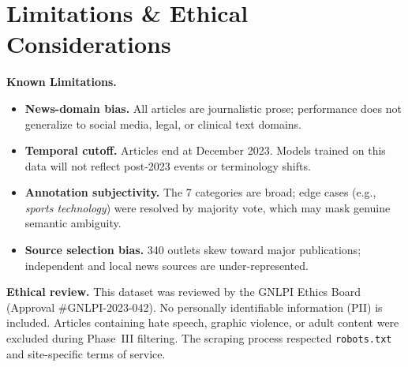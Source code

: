 \section{Limitations \& Ethical Considerations}

\begin{warnbox}
  \textbf{\textcolor{orange}{\faExclamationTriangle}\quad Known Limitations.}
  \begin{itemize}[leftmargin=*]
    \item \textbf{News-domain bias.} All articles are journalistic prose; performance
          does not generalize to social media, legal, or clinical text domains.
    \item \textbf{Temporal cutoff.} Articles end at December 2023. Models trained on this
          data will not reflect post-2023 events or terminology shifts.
    \item \textbf{Annotation subjectivity.} The 7 categories are broad; edge cases
          (e.g., \textit{sports technology}) were resolved by majority vote, which may
          mask genuine semantic ambiguity.
    \item \textbf{Source selection bias.} 340 outlets skew toward major publications;
          independent and local news sources are under-represented.
  \end{itemize}
\end{warnbox}

\medskip
\textbf{Ethical review.} This dataset was reviewed by the GNLPI Ethics Board (Approval
\#GNLPI-2023-042). No personally identifiable information (PII) is included. Articles
containing hate speech, graphic violence, or adult content were excluded during
Phase~III filtering. The scraping process respected \texttt{robots.txt} and site-specific
terms of service.


